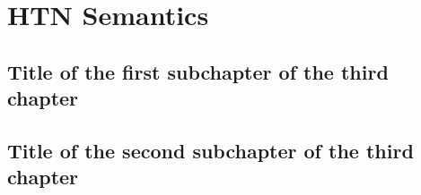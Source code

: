\chapter{{HTN} Semantics}

\medskip\noindent

\section{Title of the first subchapter of the third chapter}

\section{Title of the second subchapter of the third chapter}